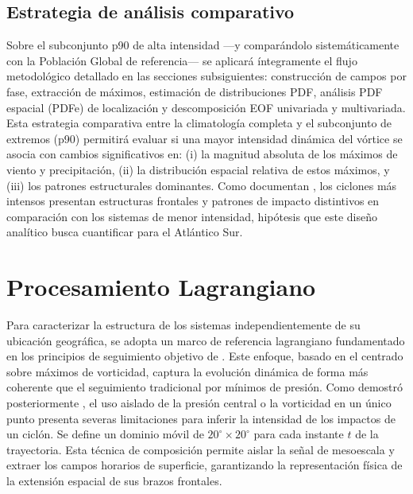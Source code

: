 

\subsection{Estrategia de análisis comparativo}\label{subsec:estrategia_analise}

Sobre el subconjunto p90 de alta intensidad —y comparándolo sistemáticamente con la Población Global de referencia— se aplicará íntegramente el flujo metodológico detallado en las secciones subsiguientes: construcción de campos por fase, extracción de máximos, estimación de distribuciones PDF, análisis PDF espacial (PDFe) de localización y descomposición EOF univariada y multivariada. 
Esta estrategia comparativa entre la climatología completa y el subconjunto de extremos (p90) permitirá evaluar si una mayor intensidad dinámica del vórtice se asocia con cambios significativos en: (i) la magnitud absoluta de los máximos de viento y precipitación, (ii) la distribución espacial relativa de estos máximos, y (iii) los patrones estructurales dominantes. 
Como documentan \citet{andrade2024composite}, los ciclones más intensos presentan estructuras frontales y patrones de impacto distintivos en comparación con los sistemas de menor intensidad, hipótesis que este diseño analítico busca cuantificar para el Atlántico Sur.

\section{Procesamiento Lagrangiano}\label{sec:procesamiento_lagrangiano}

Para caracterizar la estructura de los sistemas independientemente de su ubicación geográfica, se adopta un marco de referencia lagrangiano fundamentado en los principios de seguimiento objetivo de \citet{sinclair1994objective}. 
Este enfoque, basado en el centrado sobre máximos de vorticidad, captura la evolución dinámica de forma más coherente que el seguimiento tradicional por mínimos de presión. 
Como demostró posteriormente \citet{sinclair1997objective}, el uso aislado de la presión central o la vorticidad en un único punto presenta severas limitaciones para inferir la intensidad de los impactos de un ciclón.
Se define un dominio móvil de $20^{\circ} \times 20^{\circ}$ para cada instante $t$ de la trayectoria. Esta técnica de composición permite aislar la señal de mesoescala y extraer los campos horarios de superficie, garantizando la representación física de la extensión espacial de sus brazos frontales.

